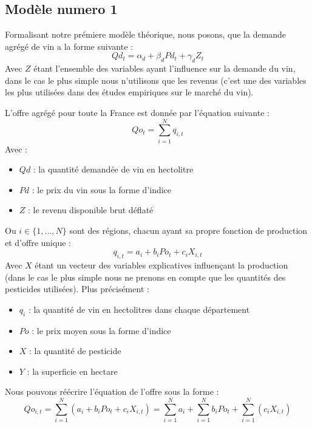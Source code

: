 \documentclass[11pt, a4paper]{article}
\begin{document}
\subsection{Modèle numero 1}
Formalisant notre prémiere modèle théorique, nous posons, que la demande agrégé de vin a la forme suivante :
\begin{equation}
    Qd_t = \alpha_d + \beta_d Pd_t + \gamma_d Z_t
\end{equation}
Avec $Z$ étant l'ensemble des variables ayant l'influence sur la demande du vin, dans le cas le plus simple nous n'utilisons que les revenus (c'est une des variables les plus utilisées dans des études empiriques sur le marché du vin).
\par
L'offre agrégé pour toute la France est donnée par l'équation suivante : 
\begin{equation}
    Qo_t = \sum_{i = 1}^{N} q_{i,t}
\end{equation}
Avec :
\begin{itemize}
  \item $Qd$ : la quantité demandée de vin en hectolitre
  \item $Pd$ : le prix du vin sous la forme d'indice
  \item $Z$ : le revenu disponible brut déflaté
\end{itemize}
Ou $i \in \{1, ..., N\}$ sont des régions, chacun ayant sa propre fonction de production et d'offre unique : 
\begin{equation}
    q_{i,t} = a_i + b_i Po_t + c_i X_{i,t}
\end{equation}
Avec $X$ étant un vecteur des variables explicatives influençant la production (dans le cas le plus simple nous ne prenons en compte que les quantités des pesticides utilisées).
Plus précisément :
\begin{itemize}
  \item $q_i$ : la quantité de vin en hectolitres dans chaque département
  \item $Po$ : le prix moyen sous la forme d'indice
  \item $X$ : la quantité de pesticide
  \item $Y$ : la superficie en hectare
\end{itemize}
Nous pouvons réécrire l'équation de l'offre sous la forme :
\begin{equation}
    Qo_{i,t} = \sum_{i = 1}^{N} (a_i + b_i Po_{t} + c_i X_{i,t}) = \sum_{i = 1}^{N} a_i + \sum_{i = 1}^{N} b_i Po_{t} + \sum_{i = 1}^{N} (c_i X_{i,t})
\end{equation}
\end{document}
